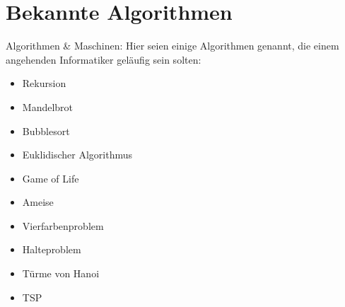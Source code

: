 \section{Bekannte Algorithmen}
%
Algorithmen \& Maschinen:
%
Hier seien einige Algorithmen genannt, die einem angehenden Informatiker geläufig sein solten:
\begin{itemize}
  \item Rekursion
  \item Mandelbrot
  \item Bubblesort
  \item Euklidischer Algorithmus
  \item Game of Life
  \item Ameise
  \item Vierfarbenproblem 
  \item Halteproblem
  \item Türme von Hanoi
  \item TSP
\end{itemize}

